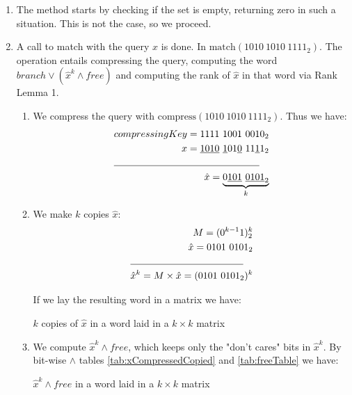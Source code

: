 \begin{enumerate}
    \item
    The method starts by checking if the set is empty, returning zero in such a situation. This is not the case, so we proceed.
    
    \item
    A call to {\ttfamily match} with the query $x$ is done. In $\text{match}(1010\ 1010\ 1111_2)$. The operation entails compressing the query, computing the word $branch \vee (\hat x^k \wedge free)$ and computing the rank of $\hat x$ in that word via Rank Lemma 1.
    \begin{enumerate}
        \item
        We compress the query with $\text{compress}(1010\ 1010\ 1111_2)$. Thus we have:
        \begin{align*}
            compressingKey = 1111\ 1001\ 0010_2\\
            x = \underline{1010}\ \underline{1}01\underline{0}\ 11\underline{1}1_2\\
            \cline{1-2}
            \hat x = \underbrace{0\underline{101}\ \underline{0101}_2}_k
        \end{align*}
        \item
        We make $k$ copies $\hat x$:
        \begin{align*}
            M = (0^{k-1}1)^k_2\\
            \hat x = 0101\ 0101_2\\
            \cline{1-2}
            \hat x^k = M \times \hat x = (0101\ 0101_2)^k\\
        \end{align*}
        
        If we lay the resulting word in a matrix we have:
        \begin{table}[H]
        \centering
        
        \caption{$k$ copies of $\hat x$ in a word laid in a $k \times k$ matrix}
        \label{tab:xCompressedCopied}
        \end{table}
        
        \item
        We compute $\hat x^k \wedge free$, which keeps only the "don't cares" bits in $\hat x^k$. By bit-wise $\wedge$ tables \ref{tab:xCompressedCopied} and \ref{tab:freeTable} we have:
        \begin{table}[H]
        \centering
        
        \caption{$\hat x^k \wedge free$ in a word laid in a $k \times k$ matrix}
        \label{tab:xCompressedANDfree}
        \end{table}
        

\end{enumerate}
\end{enumerate}
